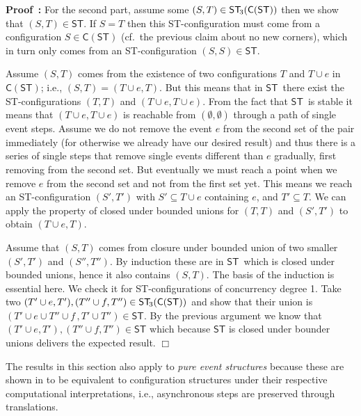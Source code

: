 \documentclass[submission,copyright,creativecommons]{eptcs}
\newtheorem{proposition}[theorem]{Proposition}
\newenvironment{proof}[1][\!\!\,]{\vspace{1ex}\noindent\textbf{Proof #1: }}{\hfill$\Box$\vspace{2ex}}
\newcommand{\cp}[1]{}
\newcommand\C{\ensuremath{\mathsf{C}}}
\newcommand\ST{\ensuremath{\mathsf{ST}}}
\newcommand\cintostThird{\ensuremath{\mathsf{ST}_{\hspace{-0.4ex}3}}}
\begin{document}
\begin{proof}
For the second part, assume some $(S,T)\in\cintostThird(\C(\ST))$ then we show that $(S,T)\in\ST$. If $S=T$ then this ST-configuration must come from a configuration $S\in\C(\ST)$ (cf.\ the previous claim about no new corners), which in turn only comes from an ST-configuration $(S,S)\in\ST$.

Assume $(S,T)$ comes from the existence of two configurations $T$ and $T\cup e$ in $\C(\ST)$; i.e., $(S,T)=(T\cup e,T)$. But this means that in \ST\ there exist the ST-configurations $(T,T)$ and $(T\cup e, T\cup e)$. From the fact that \ST\ is stable it means that $(T\cup e, T\cup e)$ is reachable from $(\emptyset,\emptyset)$ through a path of single event steps. Assume we do not remove the event $e$ from the second set of the pair immediately (for otherwise we already have our desired result) and thus there is a series of single steps that remove single events different than $e$ gradually, first removing from the second set. But eventually we must reach a point when we remove $e$ from the second set and not from the first set yet. This means we reach an ST-configuration $(S',T')$ with $S'\subseteq T\cup e$ containing $e$, and $T'\subseteq T$. We can apply the property of closed under bounded unions for $(T,T)$ and $(S',T')$ to obtain $(T\cup e,T)$.

Assume that $(S,T)$ comes from closure under bounded union of two smaller $(S',T')$ and $(S'',T'')$. By induction these are in \ST\ which is closed under bounded unions, hence it also contains $(S,T)$. 
The basis of the induction is essential here. We check it for ST-configurations of concurrency degree 1. Take two $(T'\cup e,T'),(T''\cup f,T'')\in\cintostThird(\C(\ST))$ and show that their union is $(T'\cup e \cup T''\cup f\,,T'\cup T'')\in\ST$. By the previous argument we know that $(T'\cup e,T'),(T''\cup f,T'')\in\ST$ which because $\ST$ is closed under bounder unions delivers the expected result.
\end{proof}



The results in this section also apply to \textit{pure event structures} because these are shown in \cite[Th.2 and Prop.2.2]{GlabbeekP09configStruct} to be equivalent to configuration structures under their respective computational interpretations, i.e., asynchronous steps are preserved through translations.

\cp{
\begin{proposition}
Two stable and adjacent-closed ST-structures are hh-bisimilar iff their corresponding (cf.~Proposition~\ref{prop_stableSTconf}) stable configuration structures are, cf.~\cite[def.9.6]{GlabbeekG01refinement}.
\end{proposition}

\begin{proof}
The proof is tedious.
\end{proof}

}
\end{document}
